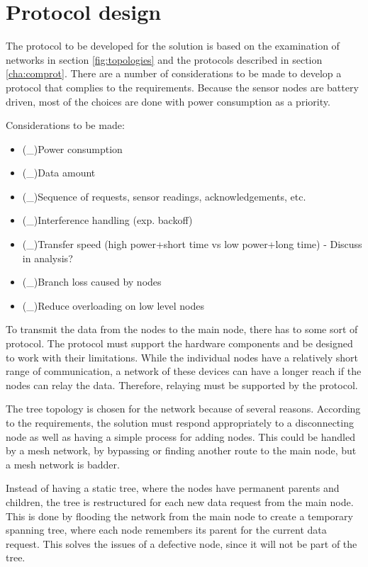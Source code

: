 \section{Protocol design}\label{cha:protocolDesign}
The protocol to be developed for the solution is based on the examination of networks in section \ref{fig:topologies} and the protocols described in section \ref{cha:comprot}. There are a number of considerations to be made to develop a protocol that complies to the requirements. Because the sensor nodes are battery driven, most of the choices are done with power consumption as a priority.

Considerations to be made:
\begin{itemize}
	\item (\_)Power consumption
	\item (\_)Data amount
	\item (\_)Sequence of requests, sensor readings, acknowledgements, etc.
	\item (\_)Interference handling (exp. backoff)
	\item (\_)Transfer speed (high power+short time vs low power+long time) - Discuss in analysis?
	\item (\_)Branch loss caused by nodes
	\item (\_)Reduce overloading on low level nodes
\end{itemize}

To transmit the data from the nodes to the main node, there has to some sort of protocol. The protocol must support the hardware components and be designed to work with their limitations. While the individual nodes have a relatively short range of communication, a network of these devices can have a longer reach if the nodes can relay the data. Therefore, relaying must be supported by the protocol. 

The tree topology is chosen for the network because of several reasons. 
According to the requirements, the solution must respond appropriately to a disconnecting node as well as having a simple process for adding nodes. 
This could be handled by a mesh network, by bypassing or finding another route to the main node, but a mesh network  is badder. 

Instead of having a static tree, where the nodes have permanent parents and children, the tree is restructured for each new data request from the main node. 
This is done by flooding the network from the main node to create a temporary spanning tree, where each node remembers its parent for the current data request. 
This solves the issues of a defective node, since it will not be part of the tree. 


